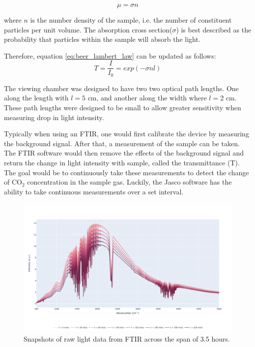 \begin{equation}
    \mu = \sigma n
    \label{eq:absorption_cross_section}
\end{equation}

where $n$ is the number density of the sample, i.e. the number of constituent particles per unit volume. The absorption cross section($\sigma$) is best described as the probability that particles within the sample will absorb the light.

Therefore, equation \ref{eq:beer_lambert_law} can be updated as follows:
\begin{equation}
    T = \frac{I}{I_0} = exp(-\sigma nl)
    \label{eq:beer_lambert_law_with_cross_section}
\end{equation}

The viewing chamber was designed to have two two optical path lengths. One along the length with $l = 5$ cm, and another along the width where $l = 2$ cm. These path lengths were designed to be small to allow greater sensitivity when measuring drop in light intensity.

Typically when using an FTIR, one would first calibrate the device by measuring the background signal. After that, a measurement of the sample can be taken. The FTIR software would then remove the effects of the background signal and return the change in light intensity with sample, called the transmittance (T). The goal would be to continuously take these measurements to detect the change of CO$_2$ concentration in the sample gas. Luckily, the Jasco software has the ability to take continuous measurements over a set interval. 

\begin{figure}[h!]
	\centering
	\includegraphics[width=\linewidth]{chapter_4/figures/raw_light_data_shift.png}
	\caption{Snapshots of raw light data from FTIR across the span of 3.5 hours.}
	\label{fig:raw_light_data_shift}
\end{figure}

